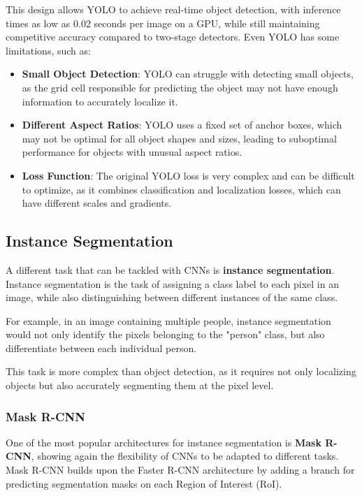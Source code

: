 This design allows YOLO to achieve real-time object detection, with inference times as low as 0.02 seconds per image on a GPU, while still maintaining competitive accuracy compared to two-stage detectors.
Even YOLO has some limitations, such as:

\begin{itemize}
    \item \textbf{Small Object Detection}: YOLO can struggle with detecting small objects, 
    as the grid cell responsible for predicting the object may not have enough information to accurately localize it.
    
    \item \textbf{Different Aspect Ratios}: YOLO uses a fixed set of anchor boxes, which may not be optimal for all object shapes and sizes, 
    leading to suboptimal performance for objects with unusual aspect ratios.
    
    \item \textbf{Loss Function}: The original YOLO loss is very complex and can be difficult to optimize,
    as it combines classification and localization losses, which can have different scales and gradients.
\end{itemize}

\subsection{Instance Segmentation}
A different task that can be tackled with CNNs is \textbf{instance segmentation}.
Instance segmentation is the task of assigning a class label to each pixel in an image, while also distinguishing between different instances of the same class.

For example, in an image containing multiple people, instance segmentation would not only identify the pixels belonging to the "person" class, 
but also differentiate between each individual person.

This task is more complex than object detection, as it requires not only localizing objects but also accurately segmenting them at the pixel level.

\subsubsection*{Mask R-CNN}
One of the most popular architectures for instance segmentation is \textbf{Mask R-CNN}, showing again the flexibility of CNNs to be adapted to different tasks.
Mask R-CNN builds upon the Faster R-CNN architecture by adding a branch for predicting segmentation masks on each Region of Interest (RoI).

